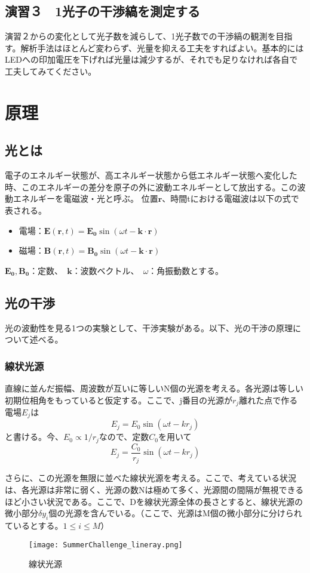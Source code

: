 \documentclass[10pt,a4j]{jarticle}
\begin{document}
\subsection{演習３　1光子の干渉縞を測定する}
演習２からの変化として光子数を減らして、1光子数での干渉縞の観測を目指す。解析手法はほとんど変わらず、光量を抑える工夫をすればよい。基本的にはLEDへの印加電圧を下げれば光量は減少するが、それでも足りなければ各自で工夫してみてください。

\clearpage
\section{原理}

\subsection{光とは}
電子のエネルギー状態が、高エネルギー状態から低エネルギー状態へ変化した時、このエネルギーの差分を原子の外に波動エネルギーとして放出する。この波動エネルギーを電磁波・光と呼ぶ。
位置$\bm{r}$、時間tにおける電磁波は以下の式で表される。
\begin{itemize}
\item 電場：$\bm{E} (\bm{r}, t) = \bm{E_0} \sin (\omega t - \bm{k} \cdot \bm{r} ) $
\item 磁場：$\bm{B} (\bm{r}, t) = \bm{B_0} \sin (\omega t - \bm{k} \cdot \bm{r} ) $
\end{itemize}
$\bm{E_0}, \bm{B_0}$：定数、　$\bm{k}$：波数ベクトル、　$\omega$：角振動数とする。

\subsection{光の干渉}
光の波動性を見る1つの実験として、干渉実験がある。以下、光の干渉の原理について述べる。
\subsubsection{線状光源}
直線に並んだ振幅、周波数が互いに等しいN個の光源を考える。各光源は等しい初期位相角をもっていると仮定する。ここで、j番目の光源が$r_j$離れた点で作る電場$E_j$は
\[
E_j = E_0 \sin(\omega t - k r_j)
\]
と書ける。今、$E_0 \varpropto 1/{r_j}$なので、定数$C_0$を用いて
\[
E_j = \frac{C_0}{r_j} \sin(\omega t - k r_j)
\]



さらに、この光源を無限に並べた線状光源を考える。ここで、考えている状況は、各光源は非常に弱く、光源の数Nは極めて多く、光源間の間隔が無視できるほど小さい状況である。ここで、Dを線状光源全体の長さとすると、線状光源の微小部分$\delta y_i$個の光源を含んでいる。（ここで、光源はM個の微小部分に分けられているとする。$1 \leq i \leq M$）
\\
\begin{figure}[b]
\begin{center}
\texttt{[image: SummerChallenge\_lineray.png]}
\caption{線状光源}
\end{center}
\end{figure}
\end{document}
